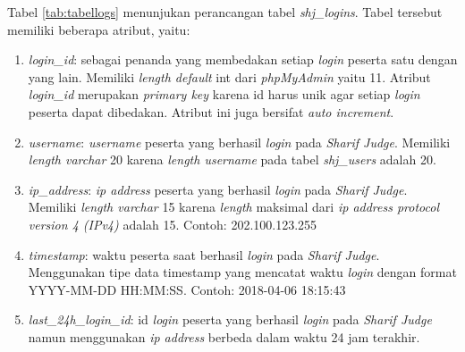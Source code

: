 Tabel \ref{tab:tabellogs} menunjukan perancangan tabel \textit{shj\_logins}. Tabel tersebut memiliki beberapa atribut, yaitu:
\begin{enumerate}
	\item \textit{login\_id}: sebagai penanda yang membedakan setiap \textit{login} peserta satu dengan yang lain. Memiliki \textit{length default} int dari \textit{phpMyAdmin} yaitu 11. Atribut \textit{login\_id} merupakan \textit{primary key} karena id harus unik agar setiap \textit{login} peserta dapat dibedakan. Atribut ini juga bersifat \textit{auto increment}.
	\item \textit{username}: \textit{username} peserta yang berhasil \textit{login} pada \textit{Sharif Judge}. Memiliki \textit{length varchar} 20 karena \textit{length username} pada tabel \textit{shj\_users} adalah 20.
	\item \textit{ip\_address}: \textit{ip address} peserta yang berhasil \textit{login} pada \textit{Sharif Judge}. Memiliki \textit{length varchar} 15 karena \textit{length} maksimal dari \textit{ip address protocol version 4 (IPv4)} adalah 15. Contoh: 202.100.123.255
	\item \textit{timestamp}: waktu peserta saat berhasil \textit{login} pada \textit{Sharif Judge}. Menggunakan tipe data timestamp yang mencatat waktu \textit{login} dengan format YYYY-MM-DD HH:MM:SS. Contoh: 2018-04-06 18:15:43
	\item \textit{last\_24h\_login\_id}: id \textit{login} peserta yang berhasil \textit{login} pada \textit{Sharif Judge} namun menggunakan \textit{ip address} berbeda dalam waktu 24 jam terakhir.
\end{enumerate}


